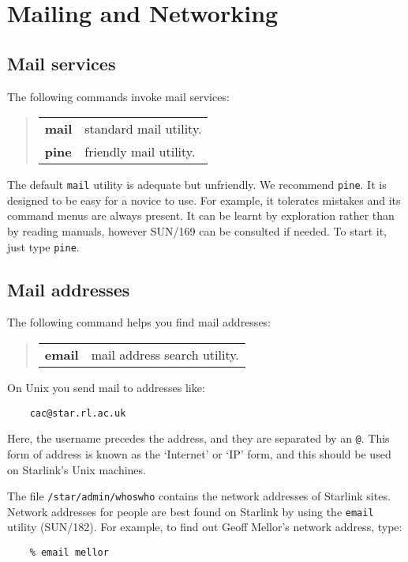 \documentclass[twoside,11pt]{article}
\newcommand{\xref}[3]{#1}
\begin{document}
\newpage

\section{Mailing and Networking\label{Mail}}

\subsection{Mail services}

The following commands invoke mail services:
\begin{quote}
\begin{tabular}{lp{67mm}}

{\bf mail}  & standard mail utility.\\
{\bf pine}  & friendly mail utility.

\end{tabular}
\end{quote}
The default {\tt mail} utility is adequate but unfriendly.
We recommend {\tt pine}.
It is designed to be easy for a novice to use.
For example, it tolerates mistakes and its command menus are always present.
It can be learnt by exploration rather than by reading manuals, however
\xref{SUN/169}{sun169}{} can be consulted if needed.
To start it, just type {\tt pine}.

\subsection{Mail addresses}

The following command helps you find mail addresses:
\begin{quote}
\begin{tabular}{lp{67mm}}

{\bf email}  & mail address search utility.

\end{tabular}
\end{quote}
On Unix you send mail to addresses like:
\begin{verbatim}
    cac@star.rl.ac.uk
\end{verbatim}
Here, the username precedes the address, and they are separated
by an {\tt @}.
This form of address is known as the `Internet' or `IP' form, and this
should be used on Starlink's Unix machines.

The file {\tt /star/admin/whoswho} contains the network addresses of Starlink
sites.
Network addresses for people are best found on Starlink by using the
{\tt email} utility
(\xref{SUN/182}{sun182}{}).
For example, to find out Geoff Mellor's network address, type:
\begin{verbatim}
    % email mellor
\end{verbatim}
\end{document}
